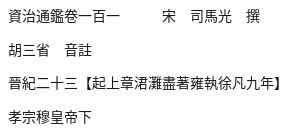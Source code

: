 










 


 
 


 

  
  
  
  
  





  
  
  
  
  
 
  

  

  
  
  



  

 
 

  
   




  

  
  


  　　資治通鑑卷一百一　　　宋　司馬光　撰

　　胡三省　音註

　　晉紀二十三【起上章涒灘盡著雍執徐凡九年】

　　孝宗穆皇帝下

